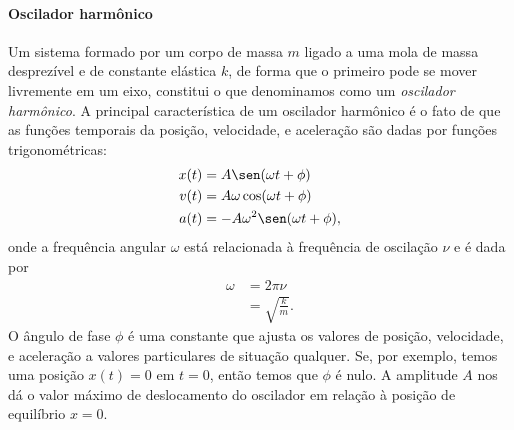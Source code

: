 \paragraph{Oscilador harmônico}

Um sistema formado por um corpo de massa $m$ ligado a uma mola de massa desprezível e de constante elástica $k$, de forma que o primeiro pode se mover livremente em um eixo, constitui o que denominamos como um \emph{oscilador harmônico}. A principal característica de um oscilador harmônico é o fato de que as funções temporais da posição, velocidade, e aceleração são dadas por funções trigonométricas:
\begin{align}
    x(t) &= A \sen(\omega t + \phi) \\
    v(t) &= A \omega \cos(\omega t + \phi) \\
    a(t) &= -A \omega^2 \sen(\omega t + \phi),
\end{align}
%
onde a frequência angular $\omega$ está relacionada à frequência de oscilação $\nu$ e é dada por
\begin{align}
    \omega &= 2\pi\nu \\
    &= \sqrt{\frac{k}{m}}. \label{Eq:FrequenciaAngular}
\end{align}
%
O ângulo de fase $\phi$ é uma constante que ajusta os valores de posição, velocidade, e aceleração a valores particulares de situação qualquer. Se, por exemplo, temos uma posição $x(t) = 0$ em $t = 0$, então temos que $\phi$ é nulo. A amplitude $A$ nos dá o valor máximo de deslocamento do oscilador em relação à posição de equilíbrio $x = 0$.

